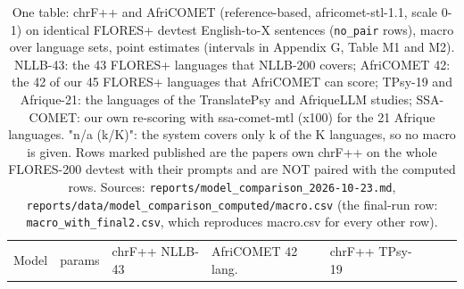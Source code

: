 \begin{table}[t]
\centering
\footnotesize
\setlength{\tabcolsep}{3pt}
\caption{One table: chrF++ and AfriCOMET (reference-based, africomet-stl-1.1, scale 0-1) on identical FLORES+ devtest English-to-X sentences (\texttt{no\_pair} rows), macro over language sets, point estimates (intervals in Appendix G, Table M1 and M2). NLLB-43: the 43 FLORES+ languages that NLLB-200 covers; AfriCOMET 42: the 42 of our 45 FLORES+ languages that AfriCOMET can score; TPsy-19 and Afrique-21: the languages of the TranslatePsy and AfriqueLLM studies; SSA-COMET: our own re-scoring with ssa-comet-mtl (x100) for the 21 Afrique languages. "n/a (k/K)": the system covers only k of the K languages, so no macro is given. Rows marked published are the papers\textquotesingle{} own chrF++ on the whole FLORES-200 devtest with their prompts and are NOT paired with the computed rows. Sources: \texttt{reports/model\_comparison\_2026-10-23.md}, \texttt{reports/data/model\_comparison\_computed/macro.csv} (the final-run row: \texttt{macro\_with\_final2.csv}, which reproduces macro.csv for every other row).}
\label{tab:t_cmp_main}
{\def\LTcaptype{none} %
\begin{tabular}{@{}
  >{\raggedright\arraybackslash}p{}
  >{\raggedleft\arraybackslash}p{}
  >{\raggedleft\arraybackslash}p{}
  >{\raggedleft\arraybackslash}p{}
  >{\raggedleft\arraybackslash}p{}
  >{\raggedleft\arraybackslash}p{}
  >{\raggedleft\arraybackslash}p{}
  >{\raggedleft\arraybackslash}p{}@{}}
\toprule
\begin{minipage}[b]{\linewidth}\raggedright
Model
\end{minipage} & \begin{minipage}[b]{\linewidth}\raggedleft
params
\end{minipage} & \begin{minipage}[b]{\linewidth}\raggedleft
chrF++ NLLB-43
\end{minipage} & \begin{minipage}[b]{\linewidth}\raggedleft
AfriCOMET 42 lang.
\end{minipage} & \begin{minipage}[b]{\linewidth}\raggedleft
chrF++ TPsy-19

\end{minipage}
\end{tabular}}
\end{table}
